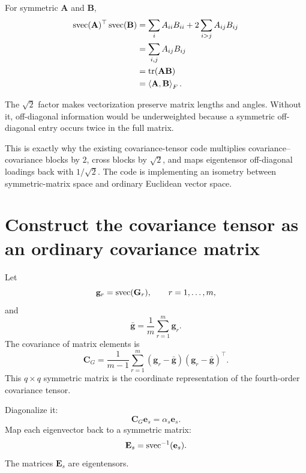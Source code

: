 For symmetric \(\mathbf A\) and \(\mathbf B\),
\begin{align}
\operatorname{svec}(\mathbf A)^\top\operatorname{svec}(\mathbf B)
&=\sum_iA_{ii}B_{ii}
+2\sum_{i>j}A_{ij}B_{ij}\\
&=\sum_{i,j}A_{ij}B_{ij}\\
&=\operatorname{tr}(\mathbf A\mathbf B)\\
&=\left\langle \mathbf A,\mathbf B\right\rangle_F.
\label{eq:svecIsometry}
\end{align}

\inwords The \(\sqrt2\) factor makes vectorization preserve matrix lengths and angles. Without it, off-diagonal information would be underweighted because a symmetric off-diagonal entry occurs twice in the full matrix.

\begin{connectionbox}
This is exactly why the existing covariance-tensor code multiplies covariance--covariance blocks by \(2\), cross blocks by \(\sqrt2\), and maps eigentensor off-diagonal loadings back with \(1/\sqrt2\). The code is implementing an isometry between symmetric-matrix space and ordinary Euclidean vector space.
\end{connectionbox}

\section{Construct the covariance tensor as an ordinary covariance matrix}

Let
\begin{equation}
\mathbf g_r=\operatorname{svec}(\mathbf{G}_r),
\qquad r=1,\ldots,m,
\end{equation}
and
\begin{equation}
\bar{\mathbf g}=\frac1m\sum_{r=1}^m\mathbf g_r.
\end{equation}
The covariance of matrix elements is
\begin{equation}
\mathbf C_G
=\frac1{m-1}\sum_{r=1}^m
(\mathbf g_r-\bar{\mathbf g})
(\mathbf g_r-\bar{\mathbf g})^\top.
\label{eq:matrixSpaceCovariance}
\end{equation}
This \(q\times q\) symmetric matrix is the coordinate representation of the fourth-order covariance tensor.

Diagonalize it:
\begin{equation}
\mathbf C_G\mathbf e_s=\alpha_s\mathbf e_s.
\end{equation}
Map each eigenvector back to a symmetric matrix:
\begin{equation}
\mathbf E_s=\operatorname{svec}^{-1}(\mathbf e_s).
\end{equation}
The matrices \(\mathbf E_s\) are eigentensors.

